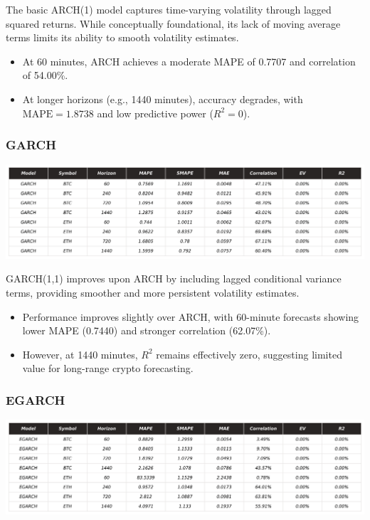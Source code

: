 \documentclass[9pt]{article}
\begin{document}
\begin{multicols}{2}
		The basic ARCH(1) model captures time-varying volatility through lagged squared returns. While conceptually foundational, its lack of moving average terms limits its ability to smooth volatility estimates.
		
		\begin{itemize}
			\item At 60 minutes, ARCH achieves a moderate MAPE of 0.7707 and correlation of 54.00\%.
			\item At longer horizons (e.g., 1440 minutes), accuracy degrades, with \( \text{MAPE} = 1.8738 \) and low predictive power (\( R^2 = 0 \)).
		\end{itemize}
		
		\subsubsection{GARCH}
		\centering
		\includegraphics[width=.95\columnwidth]{img/_KPI_GARCH.png}
		\label{fig:_KPI_GARCH}
		\justifying
		\medskip
		
		GARCH(1,1) improves upon ARCH by including lagged conditional variance terms, providing smoother and more persistent volatility estimates.
		
		\begin{itemize}
			\item Performance improves slightly over ARCH, with 60-minute forecasts showing lower MAPE (0.7440) and stronger correlation (62.07\%).
			\item However, at 1440 minutes, \( R^2 \) remains effectively zero, suggesting limited value for long-range crypto forecasting.
		\end{itemize}
		
		\subsubsection{EGARCH}
		\centering
		\includegraphics[width=.95\columnwidth]{img/_KPI_EGARCH.png}
		\label{fig:_KPI_EGARCH}
		\justifying
		\medskip
		

\end{multicols}
\end{document}
